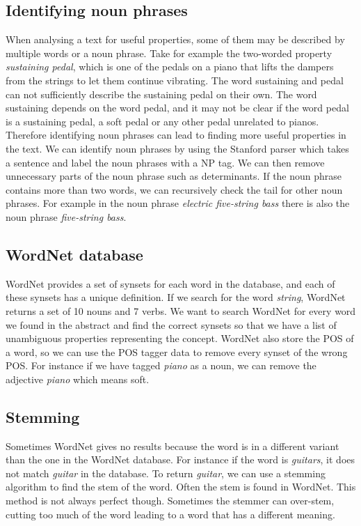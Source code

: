 
\subsection{Identifying noun phrases}
When analysing a text for useful properties, some of them may be described by multiple words or a noun phrase. Take for example the two-worded property \emph{sustaining pedal}, which is one of the pedals on a piano that lifts the dampers from the strings to let them continue vibrating. The word sustaining and pedal can not sufficiently describe the sustaining pedal on their own. The word sustaining depends on the word pedal, and it may not be clear if the word pedal is a sustaining pedal, a soft pedal or any other pedal unrelated to pianos. Therefore identifying noun phrases can lead to finding more useful properties in the text. We can identify noun phrases by using the Stanford parser which takes a sentence and label the noun phrases with a NP tag. We can then remove unnecessary parts of the noun phrase such as determinants. If the noun phrase contains more than two words, we can recursively check the tail for other noun phrases. For example in the noun phrase \emph{electric five-string bass} there is also the noun phrase \emph{five-string bass}.


\subsection{WordNet database}
WordNet provides a set of synsets for each word in the database, and each of these synsets has a unique definition. If we search for the word \emph{string}, WordNet returns a set of 10 nouns and 7 verbs. We want to search WordNet for every word we found in the abstract and find the correct synsets so that we have a list of unambiguous properties representing the concept. WordNet also store the POS of a word, so we can use the POS tagger data to remove every synset of the wrong POS. For instance if we have tagged \emph{piano} as a noun, we can remove the adjective \emph{piano} which means soft.

\subsection{Stemming}
Sometimes WordNet gives no results because the word is in a different variant than the one in the WordNet database. For instance if the word is \emph{guitars}, it does not match \emph{guitar} in the database. To return \emph{guitar}, we can use a stemming algorithm to find the stem of the word. Often the stem is found in WordNet. This method is not always perfect though. Sometimes the stemmer can over-stem, cutting too much of the word leading to a word that has a different meaning. %

